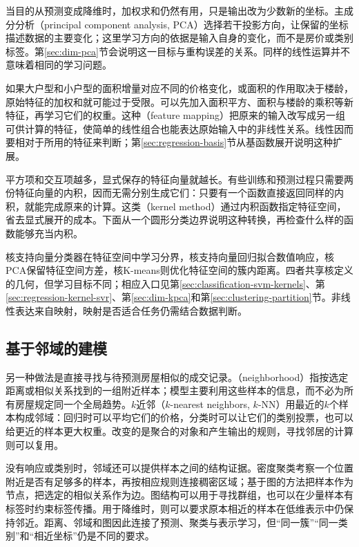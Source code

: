 当目的从预测变成降维时，加权求和仍然有用，只是输出改为少数新的坐标。主成分分析（principal component analysis, PCA）选择若干投影方向，让保留的坐标描述数据的主要变化；这里学习方向的依据是输入自身的变化，而不是房价或类别标签。第\ref{sec:dim-pca}节会说明这一目标与重构误差的关系。同样的线性运算并不意味着相同的学习问题。

如果大户型和小户型的面积增量对应不同的价格变化，或面积的作用取决于楼龄，原始特征的加权和就可能过于受限。可以先加入面积平方、面积与楼龄的乘积等新特征，再学习它们的权重。这种（feature mapping）把原来的输入改写成另一组可供计算的特征，使简单的线性组合也能表达原始输入中的非线性关系。线性因而要相对于所用的特征来判断；第\ref{sec:regression-basis}节从基函数展开说明这种扩展。

平方项和交互项越多，显式保存的特征向量就越长。有些训练和预测过程只需要两份特征向量的内积，因而无需分别生成它们：只要有一个函数直接返回同样的内积，就能完成原来的计算。这类（kernel method）通过内积函数指定特征空间，省去显式展开的成本。下面从一个圆形分类边界说明这种转换，再检查什么样的函数能够充当内积。



核支持向量分类器在特征空间中学习分界，核支持向量回归拟合数值响应，核PCA保留特征空间方差，核K-means则优化特征空间的簇内距离。四者共享核定义的几何，但学习目标不同；相应入口见第\ref{sec:classification-svm-kernels}、第\ref{sec:regression-kernel-svr}、第\ref{sec:dim-kpca}和第\ref{sec:clustering-partition}节。非线性表达来自映射，映射是否适合任务仍需结合数据判断。

\subsection{基于邻域的建模}
\label{sec:classic-overview-neighborhood}

另一种做法是直接寻找与待预测房屋相似的成交记录。（neighborhood）指按选定距离或相似关系找到的一组附近样本；模型主要利用这些样本的信息，而不必为所有房屋规定同一个全局趋势。$k$近邻（$k$-nearest neighbors, $k$-NN）用最近的$k$个样本构成邻域：回归时可以平均它们的价格，分类时可以让它们的类别投票，也可以给更近的样本更大权重。改变的是聚合的对象和产生输出的规则，寻找邻居的计算则可以复用。

没有响应或类别时，邻域还可以提供样本之间的结构证据。密度聚类考察一个位置附近是否有足够多的样本，再按相应规则连接稠密区域；基于图的方法把样本作为节点，把选定的相似关系作为边。图结构可以用于寻找群组，也可以在少量样本有标签时约束标签传播。用于降维时，则可以要求原本相近的样本在低维表示中仍保持邻近。距离、邻域和图因此连接了预测、聚类与表示学习，但“同一簇”“同一类别”和“相近坐标”仍是不同的要求。

